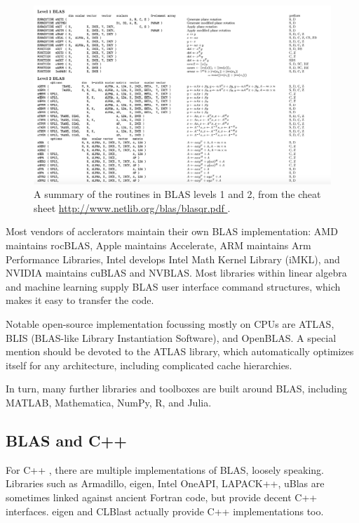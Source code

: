 \begin{figure}[t!]
\includegraphics[width=\textwidth]{./static/blas02.png}
\caption{A summary of the routines in BLAS levels 1 and 2, from the cheat sheet \url{http://www.netlib.org/blas/blasqr.pdf
}.}
\label{blas02png}
\end{figure}

Most vendors of acclerators maintain their own BLAS 
 implementation:
 AMD maintains rocBLAS,
 Apple maintains Accelerate, 
 ARM maintains Arm Performance Libraries,
 Intel develops Intel Math Kernel Library (iMKL), and 
 NVIDIA maintains cuBLAS and NVBLAS.
Most libraries within linear algebra and machine learning
 supply BLAS user interface command structures, 
 which makes it easy to transfer the code.

Notable open-source implementation focussing 
mostly on CPUs are ATLAS, BLIS (BLAS-like Library Instantiation Software), and OpenBLAS.
A special mention should be devoted to the ATLAS library, 
which automatically optimizes itself for any architecture,
including complicated cache hierarchies. 

In turn, many further libraries and toolboxes are built 
around BLAS, including MATLAB, Mathematica, NumPy, R, 
and Julia.

\subsection{BLAS and C++}

For C++ , there are multiple implementations of BLAS, loosely speaking.
Libraries such as Armadillo, eigen, Intel OneAPI, LAPACK++, uBlas are 
sometimes linked against ancient Fortran code, but provide decent C++ interfaces. 
eigen and CLBlast actually provide C++ implementations too.

